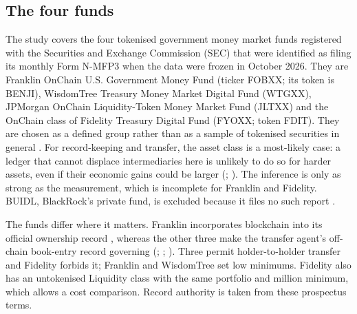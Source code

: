 \documentclass[12pt,a4paper]{article}
\begin{document}
\subsection{The four funds}
The study covers the four tokenised government money market funds registered with the Securities and Exchange Commission (SEC) that were identified as filing its monthly Form \mbox{N-MFP3} when the data were frozen in October 2026. They are Franklin OnChain U.S. Government Money Fund (ticker FOBXX; its token is BENJI), WisdomTree Treasury Money Market Digital Fund (WTGXX), JPMorgan OnChain Liquidity-Token Money Market Fund (JLTXX) and the OnChain class of Fidelity Treasury Digital Fund (FYOXX; token FDIT). They are chosen as a defined group rather than as a sample of tokenised securities in general \citep[p.~295]{SeawrightGerring2008}. For record-keeping and transfer, the asset class is a most-likely case: a ledger that cannot displace intermediaries here is unlikely to do so for harder assets, even if their economic gains could be larger (\citealp[p.~12]{Levy2008}; \citealp[p.~232]{Gerring2007}). The inference is only as strong as the measurement, which is incomplete for Franklin and Fidelity. BUIDL, BlackRock's private fund, is excluded because it files no such report \citep[pp.~27--29]{IOSCO2025}.

The funds differ where it matters. Franklin incorporates blockchain into its official ownership record \citep[p.~6]{FranklinOnChain2026}, whereas the other three make the transfer agent's off-chain book-entry record governing (\citealp[p.~115]{WisdomTreeTMMDF2025}; \citealp[p.~2]{JPMorganOnChainLTMMF2026}; \citealp[Use of Blockchain]{FidelityTDF2026}). Three permit holder-to-holder transfer and Fidelity forbids it; Franklin and WisdomTree set low minimums. Fidelity also has an untokenised Liquidity class with the same portfolio and  million minimum, which allows a cost comparison. Record authority is taken from these prospectus terms.
\end{document}
